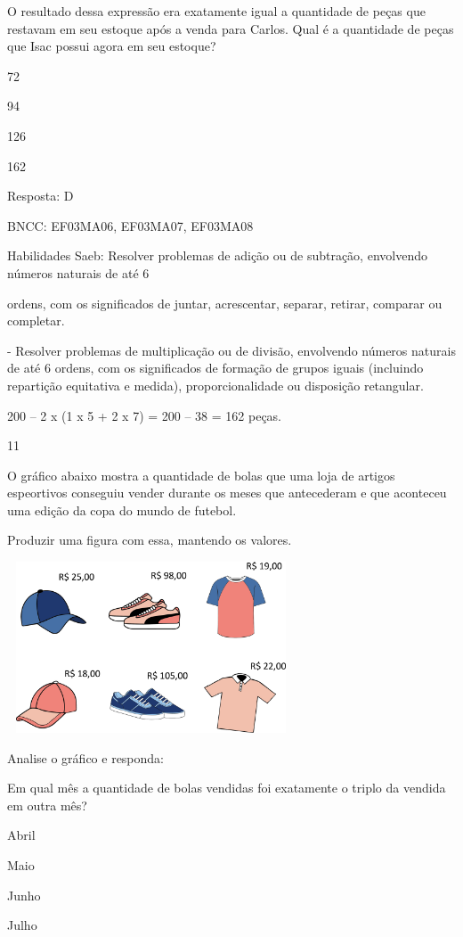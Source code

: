 \begin{escolha}
{\begin{escolha}
{O resultado dessa expressão era exatamente igual a quantidade de peças
que restavam em seu estoque após a venda para Carlos. Qual é a
quantidade de peças que Isac possui agora em seu estoque?

\begin{escolha}
\item
  72
\item
  94
\item
  126
\item
  162
\end{escolha}

Resposta: D

BNCC: EF03MA06, EF03MA07, EF03MA08

Habilidades Saeb: Resolver problemas de adição ou de subtração,
envolvendo números naturais de até 6

ordens, com os significados de juntar, acrescentar, separar, retirar,
comparar ou completar.

- Resolver problemas de multiplicação ou de divisão, envolvendo números
naturais de até 6 ordens, com os significados de formação de grupos
iguais (incluindo repartição equitativa e medida), proporcionalidade ou
disposição retangular.

200 -- 2 x (1 x 5 + 2 x 7) = 200 -- 38 = 162 peças.

\num{11}

O gráfico abaixo mostra a quantidade de bolas que uma loja de artigos
espeortivos conseguiu vender durante os meses que antecederam e que
aconteceu uma edição da copa do mundo de futebol.

Produzir uma figura com essa, mantendo os valores.

\includegraphics[width=3.36538in,height=2.00040in]{media/image120.png}

Analise o gráfico e responda:

Em qual mês a quantidade de bolas vendidas foi exatamente o triplo da
vendida em outra mês?

\begin{escolha}
\item
  Abril
\item
  Maio
\item
  Junho
\item
  Julho
\end{escolha}

}
\end{escolha}}
\end{escolha}
